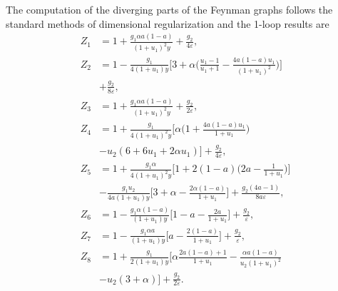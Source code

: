 \documentclass[aps,pre,url,twocolumn,superscriptaddress]{revtex4-1}
\def\eps{\varepsilon}
\newcommand{\NB}[1]{\ensuremath{\biggl( #1  \biggl) }}
\begin{document}
The computation of the diverging parts of the Feynman graphs
follows the standard methods
of dimensional regularization \cite{Amit,Vasiliev} and the 1-loop results
are
\begin{align}
   \label{eq:RG_inverse1}
   Z_1 & =  1 + \frac{g_1\alpha a(1-a)}{(1+u_1)^2y} + \frac{g_2}{4\eps},
   \nonumber  \\   
   Z_2 & =  1 - \frac{g_1}{4(1+u_1)y}\biggl[ 3+ 
     \alpha \NB{\frac{u_1-1}{u_1+1}-\frac{4a(1-a)u_1}{(1+u_1)^2} } \biggl]
    \nonumber\\
    & +  \frac{g_2}{8 \eps},
    \nonumber \\
   Z_3 & =  1 + \frac{g_1\alpha a(1-a) }{(1+u_1)^2 y} +\frac{g_2}{2 \eps},
   \nonumber \\
   Z_4 & =  1 + \frac{g_1}{4(1+u_1)^2 y}\biggl[\alpha
   \NB{1+\frac{4a(1-a)u_1}{1+u_1} } \nonumber\\
   & -  
      u_2(6+6u_1+2\alpha u_1)  \biggl]  + \frac{g_2}{4\eps},
    \nonumber
   \\
   Z_5 & =  1 + \frac{g_1\alpha}{4(1+u_1)^2y}\biggl[1+2(1-a)
   \NB{2a-\frac{1}{1+u_1} }
   \biggl]
   \nonumber\\
   & - \frac{g_1 u_2}{4a(1+u_1)y}\biggl[ 3+\alpha - \frac{2\alpha(1-a)}{1+u_1}
   \biggl] + \frac{g_2(4a-1)}{8a\eps},
   \nonumber \\
   Z_6 & =  1 - \frac{g_1\alpha(1-a) }{(1+u_1) y}\biggl[1-a-\frac{2a}{1+u_1} \biggl]
    + \frac{g_2}{\eps},
    \nonumber \\
   Z_7 & =  1 - \frac{g_1\alpha a}{(1+u_1) y}\biggl[
   a-\frac{2(1-a)}{1+u_1}
   \biggl] + \frac{g_2}{\eps},
   \nonumber \\
   Z_8 & =  1 +\frac{g_1}{2(1+u_1)y}\biggl[\alpha\frac{2a(1-a)+1}{1+u_1} -
   \frac{\alpha a(1-a)}{u_2(1+u_1)^2} \nonumber \\
   & -  u_2(3+\alpha) \biggl] + \frac{g_2}{2\eps}.
\end{align}
\end{document}
